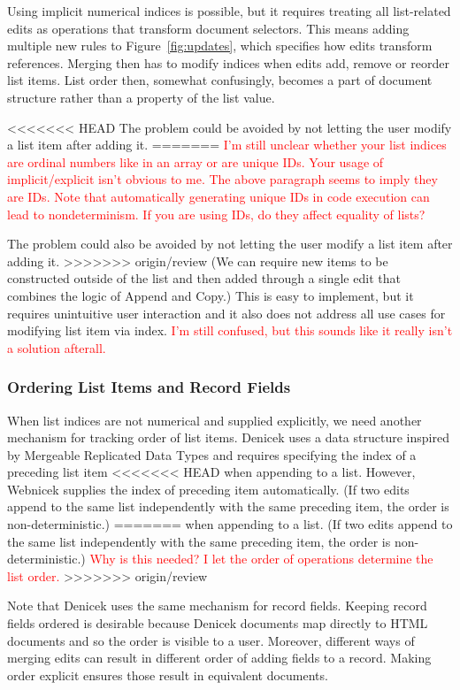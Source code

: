 \documentclass[sigconf,anonymous,screen]{acmart}
\newcommand{\ident}[1]{{\sffamily #1}}
\newcommand{\note}[1]{\textcolor{red}{#1}}
\begin{document}
Using implicit numerical indices is possible, but it requires treating all list-related edits
as operations that transform document selectors. This means adding multiple new rules to
Figure~\ref{fig:updates}, which specifies how edits transform references. Merging then has to
modify indices when edits add, remove or reorder list items. List order then, somewhat confusingly,
becomes a part of document structure rather than a property of the list value.

<<<<<<< HEAD
The problem could be avoided by not letting the user modify a list item after adding it.
=======
\note{I'm still unclear whether your list indices are ordinal numbers like in an array or are unique IDs. Your usage of implicit/explicit isn't obvious to me. The above paragraph seems to imply they are IDs. Note that automatically generating unique IDs in code execution can lead to nondeterminism. If you are using IDs, do they affect equality of lists?}

The problem could also be avoided by not letting the user modify a list item after adding it.
>>>>>>> origin/review
(We can require new items to be constructed outside of the list and then added through a
single edit that combines the logic of \ident{Append} and \ident{Copy}.) This is easy to
implement, but it requires unintuitive user interaction and it also does not address all
use cases for modifying list item via index. \note{I'm still confused, but this sounds like it really isn't a solution afterall.}

\subsubsection*{Ordering List Items and Record Fields}
When list indices are not numerical and supplied explicitly, we need another mechanism for
tracking order of list items. Denicek uses a data structure inspired by Mergeable Replicated
Data Types \cite{kaki-2019-mrdts} and requires specifying the index of a preceding list item
<<<<<<< HEAD
when appending to a list. However, Webnicek supplies the index of preceding item automatically.
(If two edits append to the same list independently with the same preceding item, the order
is non-deterministic.)
=======
when appending to a list. (If two edits append to the same list independently with the same
preceding item, the order is non-deterministic.) \note{Why is this needed? I let the order of operations determine the list order. }
>>>>>>> origin/review

Note that Denicek uses the same mechanism for record fields. Keeping record fields ordered is
desirable because Denicek documents map directly to HTML documents and so the order is visible
to a user. Moreover, different ways of merging edits can result in different order of adding fields
to a record. Making order explicit ensures those result in equivalent documents.
\end{document}
